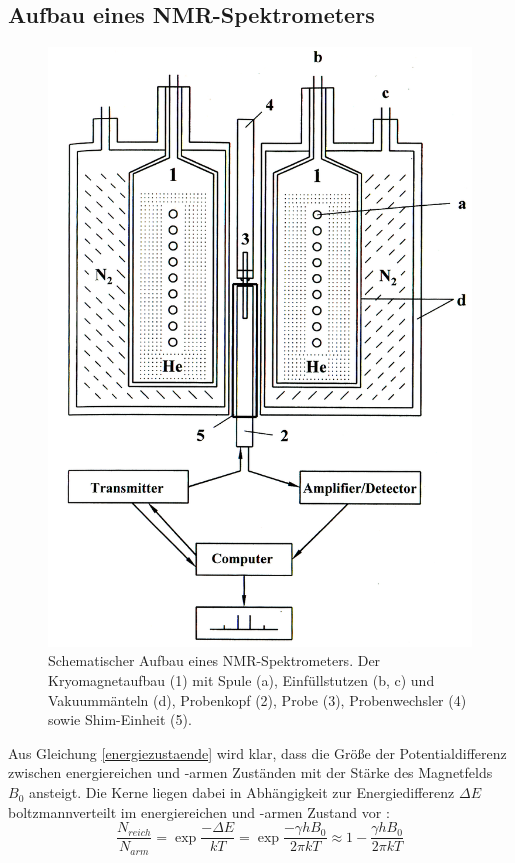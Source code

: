 \documentclass[a4paper, 11pt, headsepline,footsepline,twoside,abstract]{scrbook}
\begin{document}
\subsection{Aufbau eines NMR-Spektrometers}
\begin{figure}
	\centering
	\includegraphics[width=0.9\columnwidth]{images/Aufbau_NMR.png}
	\caption{Schematischer Aufbau eines NMR-Spektrometers. Der Kryomagnetaufbau (1) mit Spule (a), Einfüllstutzen (b, c) und Vakuummänteln (d), Probenkopf (2), Probe (3), Probenwechsler (4) sowie Shim-Einheit (5). }
	\label{aufbau_nmr}
\end{figure}
Aus Gleichung \ref{energiezustaende} wird klar, dass die Größe der Potentialdifferenz zwischen energiereichen und -armen Zuständen mit der Stärke des Magnetfelds $B_0$ ansteigt. Die Kerne liegen dabei in Abhängigkeit zur Energiedifferenz $\Delta E$ boltzmannverteilt im energiereichen und -armen Zustand vor \cite{Guenther2013}:
\begin{equation} %
\frac{N_{reich}}{N_{arm}} = \exp{\frac{-\Delta E}{kT}}=\exp{\frac{-\gamma h B_0}{2\pi k T}} \approx 1-\frac{\gamma h B_0}{2 \pi k T}
\end{equation}
\end{document}
